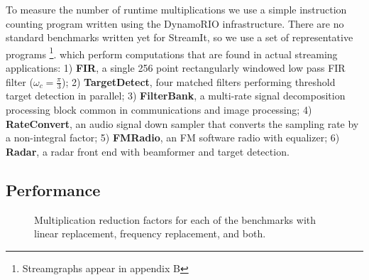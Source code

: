To measure the number of runtime multiplications we use a simple instruction counting 
program written using the DynamoRIO\cite{dynamo99} infrastructure. 
There are no standard benchmarks written yet for StreamIt, so we use
a set of representative programs
\footnote{Streamgraphs appear in appendix B}.
which perform computations that 
are found in actual streaming applications: 1) {\bf FIR}, a single 256
point rectangularly windowed low pass FIR filter
($\omega_c=\frac{\pi}{3}$); 2) {\bf TargetDetect}, four matched
filters performing threshold target detection in parallel; 3) {\bf
FilterBank}, a multi-rate signal decomposition processing block common
in communications and image processing; 4) {\bf RateConvert}, an audio
signal down sampler that converts the sampling rate by a non-integral
factor; 5) {\bf FMRadio}, an FM software radio with equalizer; 6) {\bf
Radar}, a radar front end with beamformer and target detection.

\subsection{Performance}



\begin{figure}
\center
\epsfxsize=3.2in
\vspace{-6pt}
\caption{Multiplication reduction factors for each of the benchmarks with linear replacement, frequency replacement, and both.}
\label{fig:linear-freq-both}
\vspace{-12pt}
\end{figure}

